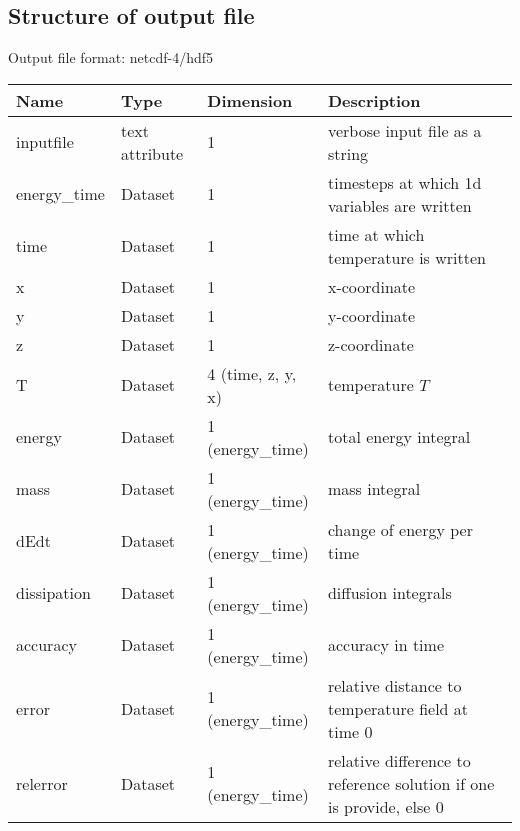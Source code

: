 \subsection{Structure of output file}
Output file format: netcdf-4/hdf5
%
\begin{longtable}{lll>{\RaggedRight}p{7cm}}
\toprule
\rowcolor{gray!50}\textbf{Name} &  \textbf{Type} & \textbf{Dimension} & \textbf{Description}  \\ \midrule
inputfile  &     text attribute & 1 & verbose input file as a string \\
energy\_time     & Dataset & 1 & timesteps at which 1d variables are written \\
time             & Dataset & 1 & time at which temperature is written \\
x                & Dataset & 1 & x-coordinate  \\
y                & Dataset & 1 & y-coordinate \\
z                & Dataset & 1 & z-coordinate \\
T                & Dataset & 4 (time, z, y, x) & temperature $T$ \\
energy           & Dataset & 1 (energy\_time) & total energy integral  \\
mass             & Dataset & 1 (energy\_time) & mass integral   \\
dEdt             & Dataset & 1 (energy\_time) & change of energy per time  \\
dissipation      & Dataset & 1 (energy\_time) & diffusion integrals  \\
accuracy         & Dataset & 1 (energy\_time) & accuracy in time  \\
error            & Dataset & 1 (energy\_time) & relative distance to temperature field at time 0\\
relerror         & Dataset & 1 (energy\_time) & relative difference to reference solution if one is provide, else 0 \\
\bottomrule
\end{longtable}





